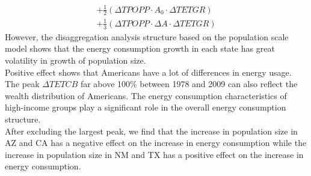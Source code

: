 \documentclass{mcmthesis}
\begin{document}
\begin{itemize}
\begin{multline}
	+\frac{1}{2}\left ( \Delta TPOPP\cdot A_{0}\cdot \Delta TETGR \right ) \\
	+\frac{1}{3}\left ( \Delta TPOPP\cdot \Delta A\cdot \Delta TETGR \right )
	\end{multline}	
	However, the disaggregation analysis structure based on the population scale model shows that the energy consumption growth in each state has great volatility in growth of population size.\\
	Positive effect shows that Americans have a lot of differences in energy usage. The peak $ \Delta TETCB $ far above 100\% between 1978 and 2009 can also reflect the wealth distribution of Americans. The energy consumption characteristics of high-income groups play a significant role in the overall energy consumption structure.\\
	After excluding the largest peak, we find that the increase in population size in AZ and CA has a negative effect on the increase in energy consumption while the increase in population size in NM and TX has a positive effect on the increase in energy consumption.
	\begin{figure}[h]
		\centering                                             %
\end{figure}
\end{itemize}
\end{document}
